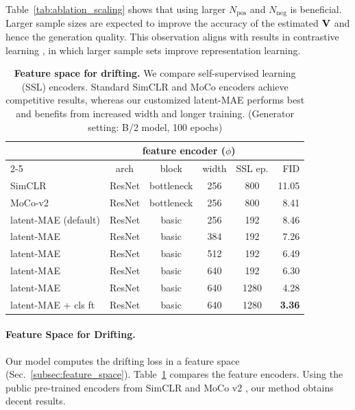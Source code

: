 Table~\ref{tab:ablation_scaling} shows that using larger $N_\text{pos}$ and $N_\text{neg}$ is beneficial. Larger sample sizes are expected to improve the accuracy of the estimated $\mathbf{V}$ and hence the generation quality.
This observation aligns with results in contrastive learning \cite{oord2018representation,he2020momentum,chen2020simple}, in which larger sample sets improve representation learning.

\begin{table}[t]
    \centering
    \caption{\textbf{Feature space for drifting.}
    We compare self-supervised learning (SSL) encoders.
    Standard SimCLR and MoCo encoders achieve competitive results, whereas our customized latent-MAE performs best and benefits from increased width and longer training.
    (Generator setting: B/2 model, 100 epochs)
    }
    \label{tab:ablation_drift_space}
    \tablefontsize
    \begin{tabular}{l | c c c c | r}
    \toprule
    \multicolumn{1}{c}{} & \multicolumn{4}{c}{feature encoder ($\phi$)} & \\
    \cmidrule(lr){2-5}
    \multicolumn{1}{c}{SSL method} & arch & block & width & \multicolumn{1}{c}{SSL ep.} & FID \\
    \midrule
    SimCLR & ResNet & bottleneck & 256 & 800 & 11.05 \\
    MoCo-v2 & ResNet & bottleneck & 256 & 800 & 8.41 \\
    \midrule
    latent-MAE (default) & ResNet & basic & 256 & 192 & 8.46 \\
    latent-MAE & ResNet & basic & 384 & 192 & 7.26 \\
    latent-MAE & ResNet & basic & 512 & 192 & 6.49 \\
    latent-MAE & ResNet & basic & 640 & 192 & 6.30 \\
    \midrule
    latent-MAE & ResNet & basic & 640 & 1280 & 4.28 \\
    latent-MAE + cls ft & ResNet & basic & 640 & 1280 & \textbf{3.36} \\
    \bottomrule
    \end{tabular}
\end{table}

\paragraph{Feature Space for Drifting.}
Our model computes the drifting loss in a feature space (Sec.~\ref{subsec:feature_space}). Table~\ref{tab:ablation_drift_space} compares the feature encoders.
Using the public pre-trained encoders from SimCLR \cite{chen2020simple} and MoCo v2 \cite{chen2020improved}, our method obtains decent results.

